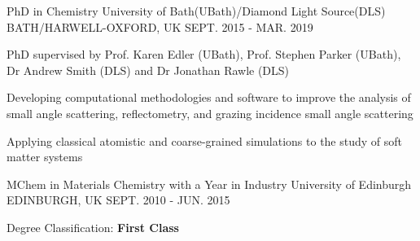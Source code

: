 \begin{cventries}
  \cventry
    {PhD in Chemistry}
    {University of Bath(UBath)/Diamond Light Source(DLS)}
    {BATH/HARWELL-OXFORD, UK}
    {SEPT. 2015 - MAR. 2019}
    {
      \begin{cvitems}
        \item {PhD supervised by Prof. Karen Edler (UBath), Prof. Stephen Parker (UBath), Dr Andrew Smith (DLS) and Dr Jonathan Rawle (DLS)}
        \item {Developing computational methodologies and software to improve the analysis of small angle scattering, reflectometry, and grazing incidence small angle scattering}
        \item {Applying classical atomistic and coarse-grained simulations to the study of soft matter systems}
      \end{cvitems}
    }
  \cventry
    {MChem in Materials Chemistry with a Year in Industry}
    {University of Edinburgh}
    {EDINBURGH, UK}
    {SEPT. 2010 - JUN. 2015}
    {
      \begin{cvitems}
        \item {Degree Classification: \textbf{First Class}}
      \end{cvitems}
    }
\end{cventries}
